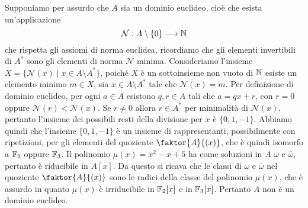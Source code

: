 \documentclass[11pt]{scrartcl}
\begin{document}
Supponiamo per assurdo che $A$ sia un dominio euclideo, cioè che esista
un'applicazione 
\[
    \mathcal{N}: A\setminus \{0\} \longrightarrow \mathbb N
\]
che rispetta gli assiomi di norma euclidea, ricordiamo che gli elementi 
invertibili di $A^*$ sono gli elementi di norma $\mathcal{N}$ minima. 
Consideriamo l'insieme $X = \{\mathcal{N}(x)\mid x \in A\setminus A^*\}$,
poiché $X$ è un sottoinsieme non vuoto di $\mathbb N$ esiste un elemento minimo 
$m \in X$, sia $x \in A\setminus A^*$ tale che $\mathcal{N}(x) = m$.
Per definizione di dominio euclideo, per ogni $a \in A$ esistono $q, r \in A$
tali che $a = qx + r$, con $r = 0$ oppure $\mathcal{N}(r) < \mathcal{N}(x)$.
Se $r \neq 0$ allora $r \in A^*$ per minimalità di $\mathcal{N}(x)$, pertanto 
l'insieme dei possibili resti della divisione per $x$ è $\{0, 1, -1\}$.
Abbiamo quindi che l'insieme $\{0, 1, -1\}$ è un insieme di rappresentanti, 
possibilmente con ripetizioni, per gli elementi del quoziente $\faktor{A}{(x)}$,
che è quindi isomorfo a $\mathbb F_2$ oppure $\mathbb F_3$.\newline
Il polinomio $\mu(x) = x^2 - x + 5$ ha come soluzioni in $A$ $\omega$ e $\overline{\omega}$,
pertanto è riducibile in $A[x]$. Da questo si ricava che le classi di $\omega$
e $\overline{\omega}$ nel quoziente $\faktor{A}{(x)}$ sono le radici della 
classe del polinomio $\mu(x)$, che è assurdo in quanto $\mu(x)$ è irriducibile
in $\mathbb F_2[x]$ e in $\mathbb F_3[x]$. Pertanto $A$ non è un dominio euclideo.
\end{document}

